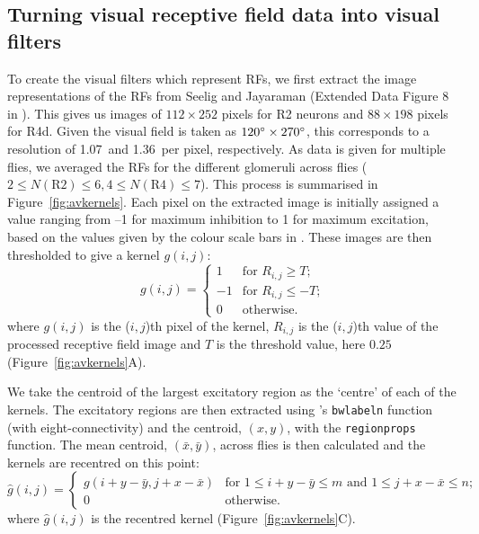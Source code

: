 \subsection*{Turning visual receptive field data into visual filters}
\label{sec:methods:preprocessing}
To create the visual filters which represent \acp{RF}, we first extract the image representations of the \acp{RF} from Seelig and Jayaraman (Extended Data Figure 8 in \cite{Seelig2013}).
This gives us images of $112\times 252$ pixels for R2 neurons and $88\times 198$ pixels for R4d.
Given the visual field is taken as $120\degree\times 270\degree$, this corresponds to a resolution of 1.07\degree\ and 1.36\degree\ per pixel, respectively.
As data is given for multiple flies, we averaged the \acp{RF} for the different glomeruli across flies ($2\le N(\mathrm{R2}) \le 6, 4\le N(\mathrm{R4})\le 7$).
This process is summarised in Figure~\ref{fig:avkernels}.
Each pixel on the extracted image is initially assigned a value ranging from --1 for maximum inhibition to 1 for maximum excitation, based on the values given by the colour scale bars in \cite{Seelig2013}.
These images are then thresholded to give a kernel $g(i,j)$:
$$
g(i,j) = \left\{ \begin{array}{rl}
1 & \mbox{for } R_{i,j} \ge T; \\
-1 & \mbox{for } R_{i,j} \le -T; \\
0 & \mbox{otherwise.}
\end{array}
\right.
$$
where $g(i,j)$ is the ($i,j$)th pixel of the kernel, $R_{i,j}$ is the ($i,j$)th value of the processed receptive field image and $T$ is the threshold value, here $0.25$ (Figure~\ref{fig:avkernels}A).

We take the centroid of the largest excitatory region as the `centre' of each of the kernels.
The excitatory regions are then extracted using \Matlab's \texttt{bwlabeln} function (with eight-connectivity) and the centroid, $(x,y)$, with the \texttt{regionprops} function.
The mean centroid, $(\bar{x},\bar{y})$, across flies is then calculated and the kernels are recentred on this point:
$$
\hat{g}(i,j) = \left\{ \begin{array}{ll} g(i+y-\bar{y},j+x-\bar{x}) & \mbox{for } 1\le i+y-\bar{y}\le m \mbox{ and } 1\le j+x-\bar{x}\le n;\\
0 & \mbox{otherwise.} \end{array} \right.
$$
where $\hat{g}(i,j)$ is the recentred kernel (Figure~\ref{fig:avkernels}C).


